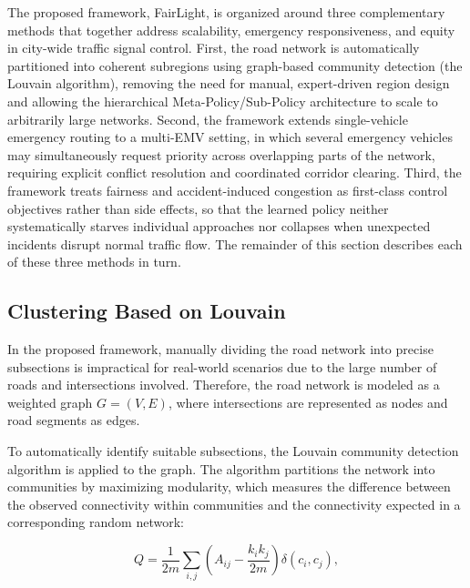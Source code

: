 \documentclass[3p,times]{elsarticle}
\theoremstyle{plain}
\theoremstyle{definition}
\begin{document}
The proposed framework, FairLight, is organized around three
complementary methods that together address scalability, emergency
responsiveness, and equity in city-wide traffic signal control.
First, the road network is automatically partitioned into coherent
subregions using graph-based community detection (the Louvain
algorithm), removing the need for manual, expert-driven region design
and allowing the hierarchical Meta-Policy/Sub-Policy architecture to
scale to arbitrarily large networks. Second, the framework extends
single-vehicle emergency routing to a multi-EMV setting, in
which several emergency vehicles may simultaneously request priority
across overlapping parts of the network, requiring explicit conflict
resolution and coordinated corridor clearing. Third, the framework
treats fairness and accident-induced congestion as
first-class control objectives rather than side effects, so that the
learned policy neither systematically starves individual approaches
nor collapses when unexpected incidents disrupt normal traffic flow.
The remainder of this section describes each of these three methods
in turn.


\subsection{Clustering Based on Louvain}\label{subsec3-1}

In the proposed framework, manually dividing the road network into
precise subsections is impractical for real-world scenarios due to
the large number of roads and intersections involved. Therefore, the
road network is modeled as a weighted graph $G = (V, E)$, where
intersections are represented as nodes and road segments as edges.

To automatically identify suitable subsections, the Louvain
community detection algorithm is applied to the graph. The algorithm
partitions the network into communities by maximizing
modularity, which measures the difference between the
observed connectivity within communities and the connectivity
expected in a corresponding random network:

\begin{equation}
Q = \frac{1}{2m}\sum_{i,j}\left(A_{ij} - \frac{k_i k_j}{2m}\right)
\delta(c_i, c_j),
\end{equation}
\end{document}
